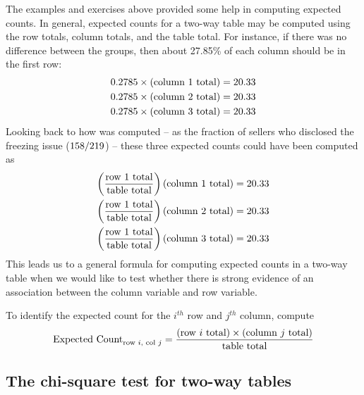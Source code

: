 The examples and exercises above provided some help
in computing expected counts.
In general, expected counts for a two-way table may
be computed using the row totals, column totals,
and the table total.
For instance, if there was no difference between the groups,
then about 27.85\% of each column should be in the first row:
\begin{align*}
0.2785{}\times (\text{column 1 total}) &= 20.33{} \\
0.2785{}\times (\text{column 2 total}) &= 20.33{} \\
0.2785{}\times (\text{column 3 total}) &= 20.33{}
\end{align*}
Looking back to how \iPodAFraction{} was computed --
as the fraction of sellers who disclosed the freezing issue
($158{}/219{}$) --
these three expected counts could have been computed as
\begin{align*}
\left(\frac{\text{row 1 total}}{\text{table total}}\right)\text{(column 1 total)} &= 20.33{} \\
\left(\frac{\text{row 1 total}}{\text{table total}}\right)\text{(column 2 total)} &= 20.33{} \\
\left(\frac{\text{row 1 total}}{\text{table total}}\right)\text{(column 3 total)} &= 20.33{}
\end{align*}
This leads us to a general formula for computing expected counts in a two-way table when we would like to test whether there is strong evidence of an association between the column variable and row variable.

\begin{termBox}{
  To identify the expected count for the $i^{th}$ row
  and $j^{th}$ column, compute
  \begin{align*}
  \text{Expected Count}_{\text{row }i,\text{ col }j}
  = \frac{(\text{row $i$ total}) \times
      (\text{column $j$ total})}{\text{table total}}\vspace{2mm}
  \end{align*}}
\end{termBox}


\subsection{The chi-square test for two-way tables}

